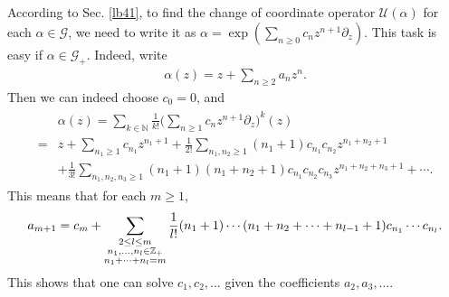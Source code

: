 \documentclass[12pt,a4paper,notitlepage]{article}
\theoremstyle{definition}
\theoremstyle{plain}
\newcommand{\mc}{\mathcal}
\newcommand{\Res}{\mathrm{Res}}
\newcommand{\Cbb}{\mathbb C}
\newcommand{\Nbb}{\mathbb N}
\newcommand{\Zbb}{\mathbb Z}
\numberwithin{equation}{section}
\begin{document}




\subsection{}



According to Sec. \ref{lb41}, to find the change of coordinate operator $\mc U(\alpha)$ for each $\alpha\in\mc G$, we need to write it as $\alpha=\exp(\sum_{n\geq 0}c_n z^{n+1}\partial_z)$. This task is easy if $\alpha\in\mc G_+$. Indeed, write
\begin{align}
\alpha(z)=z+\sum_{n\geq 2}a_nz^n.	
\end{align}
Then we can indeed choose $c_0=0$, and
\begin{align}\label{eq163}
\begin{aligned}
&\alpha(z)=\sum_{k\in\Nbb}\frac 1{k!}\Big(\sum_{n\geq 1}c_n z^{n+1}\partial_z\Big)^k(z)\\
=&z+\sum_{n_1\geq 1}c_{n_1}z^{n_1+1}+\frac 1{2!}\sum_{n_1,n_2\geq 1}(n_1+1)c_{n_1}c_{n_2}z^{n_1+n_2+1}\\
&+\frac 1{3!}\sum_{n_1,n_2,n_3\geq1}(n_1+1)(n_1+n_2+1)c_{n_1}c_{n_2}c_{n_3}z^{n_1+n_2+n_3+1}+\cdots.
\end{aligned}
\end{align}
This means that for each $m\geq 1$,
\begin{align}
a_{m+1}=c_m+\sum_{\begin{subarray}{c}
2\leq l\leq m\\
n_1,\dots,n_l\in\Zbb_+\\
n_1+\cdots+n_l=m		
\end{subarray}}	
\frac 1{l!}(n_1+1)\cdots (n_1+n_2+\cdots +n_{l-1}+1)c_{n_1}\cdots c_{n_l}.\label{eq158}
\end{align}
This shows that one can solve $c_1,c_2,\dots$ given the coefficients $a_2,a_3,\dots$.
\end{document}
